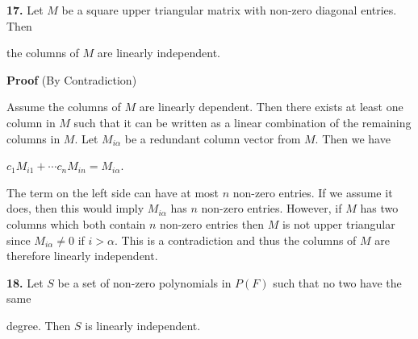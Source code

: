\documentclass[12pt, a4paper]{article}
\begin{document}
\vspace{4mm}

\noindent\textbf{17.} Let $M$ be a square upper triangular matrix with non-zero diagonal entries. Then\par the columns of $M$ are linearly independent.

\vspace{4mm}

\begin{addmargin}[1.4em]{1.4em}

    \noindent\textbf{Proof} (By Contradiction)
    
    \vspace{2mm}
    
    \noindent Assume the columns of $M$ are linearly dependent. Then there exists at least one column in $M$ such that it can be written as a linear combination of the remaining columns in $M$. Let $M_{i\alpha}$ be a redundant column vector from $M$. Then we have
    
    \vspace{2mm}
    
    \centerline{$c_1M_{i1}+\cdots c_nM_{in}=M_{i\alpha}$.}
    
    \vspace{2mm}
    
    \noindent The term on the left side can have at most $n$ non-zero entries. If we assume it does, then this would imply $M_{i\alpha}$ has $n$ non-zero entries. However, if $M$ has two columns which both contain $n$ non-zero entries then $M$ is not upper triangular since $M_{i\alpha}\neq 0$ if $i>\alpha$. This is a contradiction and thus the columns of $M$ are therefore linearly independent.\hspace{89mm}\blacksquare

\end{addmargin}

\vspace{4mm}

\noindent\textbf{18.} Let $S$ be a set of non-zero polynomials in $P(F)$ such that no two have the same\par degree. Then $S$ is linearly independent.

\vspace{4mm}
\end{document}
